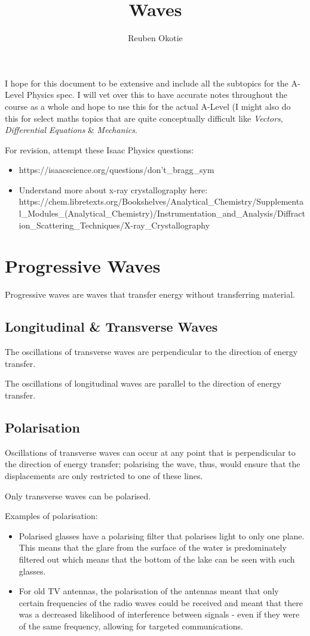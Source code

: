 \documentclass{article}
\title{Waves}
\author{Reuben Okotie}
\date{}
\begin{document}
\maketitle
I hope for this document to be extensive and include all the subtopics for the A-Level Physics spec. I will vet over this to have accurate notes throughout the course as a whole and hope to use this for the actual A-Level (I might also do this for select maths topics that are quite conceptually difficult like \textit{Vectors}, \textit{Differential Equations} \& \textit{Mechanics}.

For revision, attempt these Isaac Physics questions: 
\begin{itemize}
    \item https://isaacscience.org/questions/don't\_bragg\_sym
    \item Understand more about x-ray crystallography here: https://chem.libretexts.org/Bookshelves/Analytical\_Chemistry/Supplemental\_Modules\_(Analytical\_Chemistry)/Instrumentation\_and\_Analysis/Diffraction\_Scattering\_Techniques/X-ray\_Crystallography
\end{itemize}


\section{Progressive Waves}
Progressive waves are waves that transfer energy without transferring material.

\subsection{Longitudinal \& Transverse Waves}
The oscillations of transverse waves are perpendicular to the direction of energy transfer. 

The oscillations of longitudinal waves are parallel to the direction of energy transfer. 

\subsection{Polarisation}
Oscillations of transverse waves can occur at any point that is perpendicular to the direction of energy transfer; polarising the wave, thus, would ensure that the displacements are only restricted to one of these lines. 

Only transverse waves can be polarised.

Examples of polarisation: 
\begin{itemize}
    \item Polarised glasses have a polarising filter that polarises light to only one plane. This means that the glare from the surface of the water is predominately filtered out which means that the bottom of the lake can be seen with such glasses. 

    \item For old TV antennas, the polarisation of the antennas meant that only certain frequencies of the radio waves could be received and meant that there was a decreased likelihood of interference between signals - even if they were of the same frequency, allowing for targeted communications.
\end{itemize}
\end{document}
